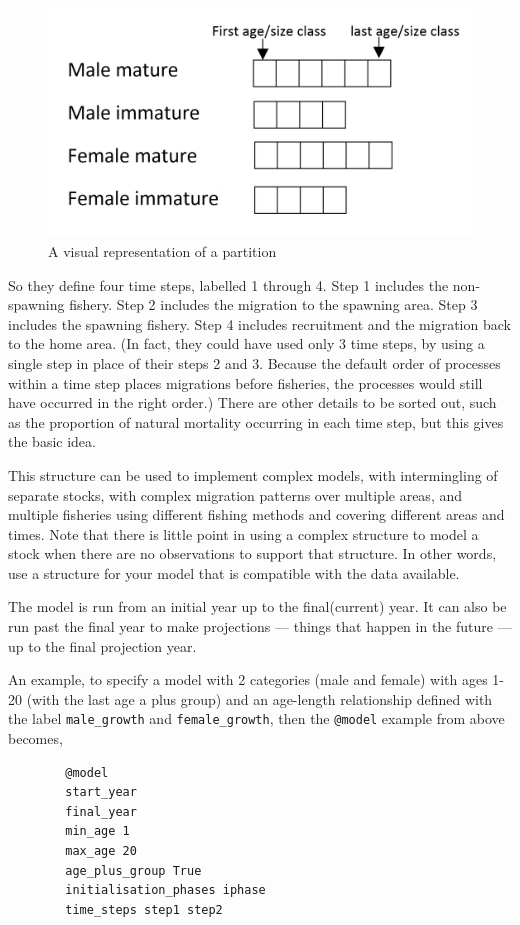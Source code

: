 \begin{figure}[H]
	\centering
	\includegraphics[scale=0.3]{Figures/partition.png}
		\caption{A visual representation of a partition}\label{Fig:part}
\end{figure}


So they define four time steps, labelled 1 through 4. Step 1 includes the non-spawning fishery. Step 2 includes the migration to the spawning area. Step 3 includes the spawning fishery. Step 4 includes recruitment and the migration back to the home area. (In fact, they could have used only 3 time steps, by using a single step in place of their steps 2 and 3. Because the default order of processes within a time step places migrations before fisheries, the processes would still have occurred in the right order.) There are other details to be sorted out, such as the proportion of natural mortality occurring in each time step, but this gives the basic idea. 

This structure can be used to implement complex models, with intermingling of separate stocks, with complex migration patterns over multiple areas, and multiple fisheries using different fishing methods and covering different areas and times. Note that there is little point in using a complex structure to model a stock when there are no observations to support that structure. In other words, use a structure for your model that is compatible with the data available. 

The model is run from an initial year up to the final(current) year. It can also be run past the final year to make projections — things that happen in the future — up to the final projection year.

An example, to specify a model with 2 categories (male and female) with ages 1-20 (with the last age a plus group) and an age-length relationship defined with the label \texttt{male\_growth} and \texttt{female\_growth}, then the \texttt{@model} example from above becomes,
{\small{\begin{verbatim}
		@model
		start_year
		final_year
		min_age 1
		max_age 20
		age_plus_group True
		initialisation_phases iphase
		time_steps step1 step2
		\end{verbatim}}}

